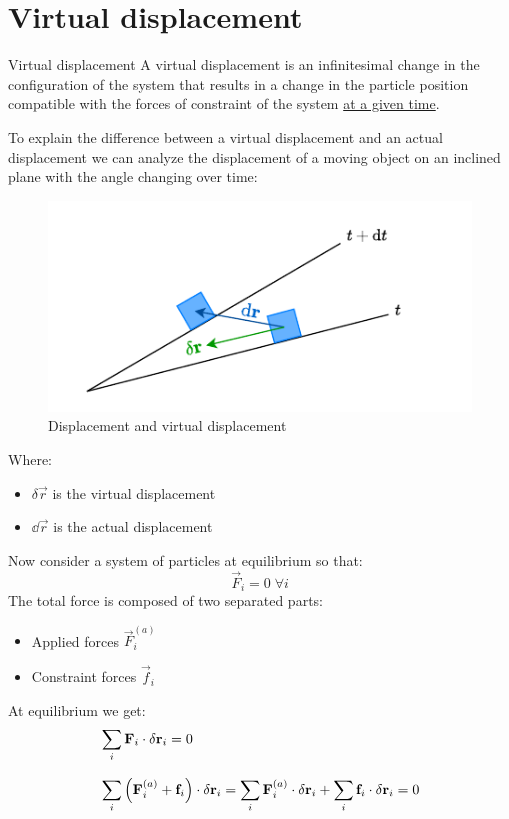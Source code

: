 \section{Virtual displacement}
\begin{definition}{Virtual displacement}
  A virtual displacement is an infinitesimal change in the configuration of the system that results in a change in the particle position compatible with the forces of constraint of the system \underline{at a given time}.
\end{definition}
To explain the difference between a virtual displacement and an actual displacement we can analyze the displacement of a moving object on an inclined plane with the angle changing over time:
\begin{figure}[H]
  \centering
  \includegraphics[width=0.5\linewidth]{res/svg/virtualdisplacement.drawio}
  \caption{Displacement and virtual displacement}
  \label{fig:image8}
\end{figure}
Where:
\begin{itemize}
    \item $\delta \vec{r}$ is the virtual displacement
    \item $\dd{\vec{r}}$ is the actual displacement
\end{itemize}
Now consider a system of particles at equilibrium so that:
\begin{equation}
    \vec{F}_i = 0\;\forall i
\end{equation}
The total force is composed of two separated parts:
\begin{itemize}
    \item Applied forces $\vec{F}^{(a)}_i$
    \item Constraint forces $\vec{f}_i$
\end{itemize}
At equilibrium we get:
\begin{equation}
    \begin{split}
      &\displaystyle\sum_i \vb{F}_i \cdot \delta \vb{r}_i = 0 \\[8pt]
      &\displaystyle\sum_i \left(\vb{F}^{(a)}_i + \vb{f}_i\right) \cdot \delta \vb{r}_i = \displaystyle\sum_i \vb{F}^{(a)}_i \cdot \delta \vb{r}_i + \displaystyle\sum_i \vb{f}_i \cdot \delta \vb{r}_i = 0
    \end{split}
\end{equation}
